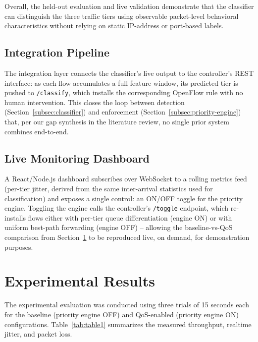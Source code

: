 Overall, the held-out evaluation and live validation demonstrate that
the classifier can distinguish the three traffic tiers using observable
packet-level behavioral characteristics without relying on static
IP-address or port-based labels.

\subsection{Integration Pipeline}
\label{subsec:integration}

The integration layer connects the classifier's live output to the
controller's REST interface: as each flow accumulates a full feature
window, its predicted tier is pushed to \texttt{/classify}, which installs
the corresponding OpenFlow rule with no human intervention. This closes
the loop between detection (Section~\ref{subsec:classifier}) and
enforcement (Section~\ref{subsec:priority-engine}) that, per our gap
synthesis in the literature review, no single prior system combines
end-to-end.

\subsection{Live Monitoring Dashboard}
\label{subsec:dashboard}

A React/Node.js dashboard subscribes over WebSocket to a rolling metrics
feed (per-tier jitter, derived from the same inter-arrival statistics used
for classification) and exposes a single control: an ON/OFF toggle for the
priority engine. Toggling the engine calls the controller's
\texttt{/toggle} endpoint, which re-installs flows either with per-tier
queue differentiation (engine ON) or with uniform best-path forwarding
(engine OFF) -- allowing the baseline-vs-QoS comparison from
Section~\ref{sec:results} to be reproduced live, on demand, for
demonstration purposes.
\section{Experimental Results}
\label{sec:results}

The experimental evaluation was conducted using three trials of 15 seconds each for the
baseline (priority engine OFF) and QoS-enabled (priority engine ON) configurations.
Table~\ref{tab:table1} summarizes the measured throughput, realtime jitter, and packet
loss.

